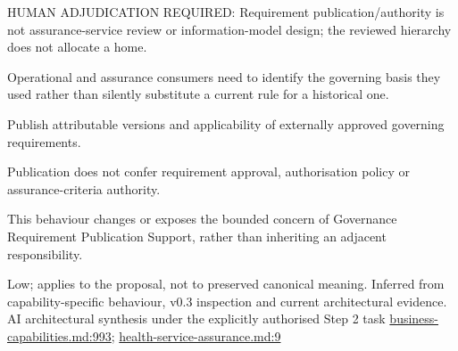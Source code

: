 HUMAN ADJUDICATION REQUIRED: Requirement publication/\allowbreak{}authority is not assurance-service review or information-model design; the reviewed hierarchy does not allocate a home.



Operational and assurance consumers need to identify the governing basis they used rather than silently substitute a current rule for a historical one.



Publish attributable versions and applicability of externally approved governing requirements.



Publication does not confer requirement approval, authorisation policy or assurance-criteria authority.



This behaviour changes or exposes the bounded concern of Governance Requirement Publication Support, rather than inheriting an adjacent responsibility.


Low; applies to the proposal, not to preserved canonical meaning.
Inferred from capability-specific behaviour, v0.3 inspection and current architectural evidence. AI architectural synthesis under the explicitly authorised Step 2 task \hyperref[evidence:a4c0900c47c945d9]{business-capabilities.md:993}; \hyperref[evidence:14c8f26d232fcb78]{health-service-assurance.md:9}
